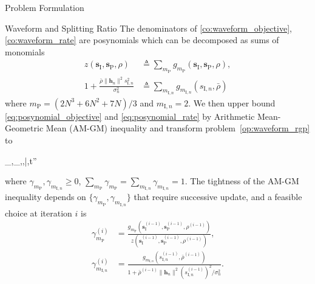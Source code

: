 \documentclass[journal]{IEEEtran}
\begin{document}
\begin{section}{Problem Formulation}
\begin{subsection}{Waveform and Splitting Ratio}
			The denominators of \eqref{co:waveform_objective}, \eqref{co:waveform_rate} are posynomials \cite{Boyd2007} which can be decomposed as sums of monomials
			\begin{align}
				z(\boldsymbol{s}_{\mathrm{I}},\boldsymbol{s}_\mathrm{P},\rho) &\triangleq \sum_{m_\mathrm{P}}{g_{m_\mathrm{P}}(\boldsymbol{s}_{\mathrm{I}},\boldsymbol{s}_\mathrm{P},\rho)}\label{eq:posynomial_objective},\\
				1+\frac{\bar{\rho}\lVert{\boldsymbol{h}_n}\rVert^2 s_{\mathrm{I},n}^2}{\sigma_n^2} &\triangleq \sum_{m_{\mathrm{I},n}}g_{m_{\mathrm{I},n}}(s_{\mathrm{I},n},\bar{\rho})\label{eq:posynomial_rate}
			\end{align}
			where $m_\mathrm{P}=(2N^3+6N^2+7N)/3$ and $m_{\mathrm{I},n}=2$. We then upper bound \eqref{eq:posynomial_objective} and \eqref{eq:posynomial_rate} by Arithmetic Mean-Geometric Mean (AM-GM) inequality \cite{Chiang2005} and transform problem~\eqref{op:waveform_rgp} to
			\begin{mini!}
				{_{},_,\rho,\bar{\rho},t''}{}{\label{op:waveform_gp}}{}
			\end{mini!}
			where $\gamma_{m_\mathrm{P}},\gamma_{m_{\mathrm{I},n}} \ge 0$, $\sum_{m_\mathrm{P}}\gamma_{m_\mathrm{P}}=\sum_{m_{\mathrm{I},n}}\gamma_{m_{\mathrm{I},n}}=1$. The tightness of the AM-GM inequality depends on $\{\gamma_{m_\mathrm{P}},\gamma_{m_{\mathrm{I},n}}\}$ that require successive update, and a feasible choice at iteration $i$ is
			\begin{align}
				\gamma_{m_\mathrm{P}}^{(i)} & = \frac{g_{m_\mathrm{P}}(\boldsymbol{s}_{\mathrm{I}}^{(i-1)},\boldsymbol{s}_\mathrm{P}^{(i-1)},\rho^{(i-1)})}{z(\boldsymbol{s}_{\mathrm{I}}^{(i-1)},\boldsymbol{s}_\mathrm{P}^{(i-1)},\rho^{(i-1)})}\label{eq:gamma_P},\\
				\gamma_{m_{\mathrm{I},n}}^{(i)} & = \frac{g_{m_{\mathrm{I},n}}(s_{\mathrm{I},n}^{(i-1)},\bar{\rho}^{(i-1)})}{1+{\bar{\rho}^{(i-1)}\lVert{\boldsymbol{h}_n}\rVert^2 (s_{\mathrm{I},n}^{(i-1)})^2}\big/{\sigma_n^2}}.\label{eq:gamma_I}
			\end{align}


\end{subsection}
\end{section}
\end{document}
